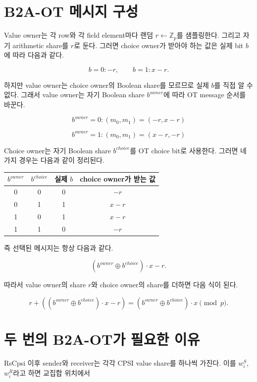 \documentclass[11pt]{article}
\begin{document}
\section*{B2A-OT 메시지 구성}

Value owner는 각 row와 각 field element마다 랜덤 \(r\leftarrow\mathbb{Z}_p\)를
샘플링한다. 그리고 자기 arithmetic share를 \(r\)로 둔다. 그러면 choice owner가
받아야 하는 값은 실제 bit \(b\)에 따라 다음과 같다.

\[
  b=0: -r, \qquad b=1: x-r.
\]

하지만 value owner는 choice owner의 Boolean share를 모르므로 실제 \(b\)를 직접 알 수
없다. 그래서 value owner는 자기 Boolean share \(b^{owner}\)에 따라 OT message 순서를
바꾼다.

\[
  b^{owner}=0: (m_0,m_1)=(-r, x-r)
\]

\[
  b^{owner}=1: (m_0,m_1)=(x-r, -r)
\]

Choice owner는 자기 Boolean share \(b^{choice}\)를 OT choice bit로 사용한다. 그러면
네 가지 경우는 다음과 같이 정리된다.

\begin{table}[h]
\centering
\begin{tabular}{cccc}
\toprule
\(b^{owner}\) & \(b^{choice}\) & 실제 \(b\) & choice owner가 받는 값 \\
\midrule
0 & 0 & 0 & \(-r\) \\
0 & 1 & 1 & \(x-r\) \\
1 & 0 & 1 & \(x-r\) \\
1 & 1 & 0 & \(-r\) \\
\bottomrule
\end{tabular}
\end{table}

즉 선택된 메시지는 항상 다음과 같다.

\[
  (b^{owner}\oplus b^{choice})\cdot x-r.
\]

따라서 value owner의 share \(r\)와 choice owner의 share를 더하면 다음 식이 된다.

\[
  r + ((b^{owner}\oplus b^{choice})\cdot x-r)
  = (b^{owner}\oplus b^{choice})\cdot x \pmod p.
\]

\section*{두 번의 B2A-OT가 필요한 이유}

RsCpsi 이후 sender와 receiver는 각각 CPSI value share를 하나씩 가진다. 이를
\(w_i^S\), \(w_i^R\)라고 하면 교집합 위치에서
\end{document}
